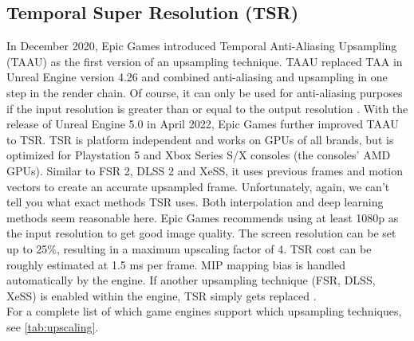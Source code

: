 \documentclass[letterpaper, 10 pt, conference]{ieeeconf}  %
\begin{document}
\subsection{Temporal Super Resolution (TSR)}

In December 2020, Epic Games introduced Temporal Anti-Aliasing Upsampling (TAAU) as the first version of an upsampling technique. 
TAAU replaced TAA in Unreal Engine version 4.26 and combined anti-aliasing and upsampling in one step in the render chain.
Of course, it can only be used for anti-aliasing purposes if the input resolution is greater than or equal to the output resolution \cite{unreal_all}.
With the release of Unreal Engine 5.0 in April 2022, Epic Games further improved TAAU to TSR.
TSR is platform independent and works on GPUs of all brands, but is optimized for Playstation 5 and Xbox Series S/X consoles (the consoles' AMD GPUs).
Similar to FSR 2, DLSS 2 and XeSS, it uses previous frames and motion vectors to create an accurate upsampled frame. 
Unfortunately, again, we can't tell you what exact methods TSR uses.
Both interpolation and deep learning methods seem reasonable here.
Epic Games recommends using at least 1080p as the input resolution to get good image quality.
The screen resolution can be set up to 25\%, resulting in a maximum upscaling factor of 4.
TSR cost can be roughly estimated at 1.5 ms per frame.
MIP mapping bias is handled automatically by the engine.
If another upsampling technique (FSR, DLSS, XeSS) is enabled within the engine, TSR simply gets replaced \cite{TSR_intro}.\\

For a complete list of which game engines support which upsampling techniques, see \ref{tab:upscaling}.
\end{document}

